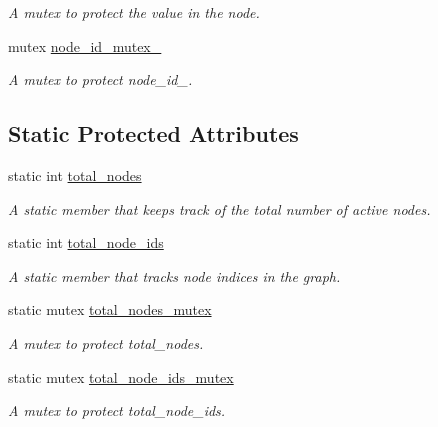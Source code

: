 \begin{DoxyCompactItemize}
\begin{DoxyCompactList}\small\item\em A mutex to protect the value in the node. \end{DoxyCompactList}\item 
mutex \hyperlink{classNode_aa2e8d02482477aa2f05db0e6bb409339}{node\+\_\+id\+\_\+mutex\+\_\+}\hypertarget{classNode_aa2e8d02482477aa2f05db0e6bb409339}{}\label{classNode_aa2e8d02482477aa2f05db0e6bb409339}

\begin{DoxyCompactList}\small\item\em A mutex to protect node\+\_\+id\+\_\+. \end{DoxyCompactList}\end{DoxyCompactItemize}
\subsection*{Static Protected Attributes}
\begin{DoxyCompactItemize}
\item 
static int \hyperlink{classNode_a7f128d924b8d003fd03b258a99e71a67}{total\+\_\+nodes}\hypertarget{classNode_a7f128d924b8d003fd03b258a99e71a67}{}\label{classNode_a7f128d924b8d003fd03b258a99e71a67}

\begin{DoxyCompactList}\small\item\em A static member that keeps track of the total number of active nodes. \end{DoxyCompactList}\item 
static int \hyperlink{classNode_a280f4f7c00e3b9755bd0b47c3d0a91b7}{total\+\_\+node\+\_\+ids}\hypertarget{classNode_a280f4f7c00e3b9755bd0b47c3d0a91b7}{}\label{classNode_a280f4f7c00e3b9755bd0b47c3d0a91b7}

\begin{DoxyCompactList}\small\item\em A static member that tracks node indices in the graph. \end{DoxyCompactList}\item 
static mutex \hyperlink{classNode_a4ee6b9388653c1d3b1d94c7b91b40253}{total\+\_\+nodes\+\_\+mutex}\hypertarget{classNode_a4ee6b9388653c1d3b1d94c7b91b40253}{}\label{classNode_a4ee6b9388653c1d3b1d94c7b91b40253}

\begin{DoxyCompactList}\small\item\em A mutex to protect total\+\_\+nodes. \end{DoxyCompactList}\item 
static mutex \hyperlink{classNode_ac18d36beb867879f0a319557e783e146}{total\+\_\+node\+\_\+ids\+\_\+mutex}\hypertarget{classNode_ac18d36beb867879f0a319557e783e146}{}\label{classNode_ac18d36beb867879f0a319557e783e146}

\begin{DoxyCompactList}\small\item\em A mutex to protect total\+\_\+node\+\_\+ids. \end{DoxyCompactList}\end{DoxyCompactItemize}


